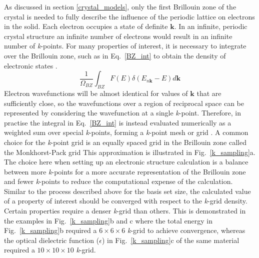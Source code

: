 \documentclass[11pt, twoside]{report}
\begin{document}
As discussed in section \ref{crystal_models}, only the first Brillouin zone of the crystal is needed to fully describe the influence of the periodic lattice on electrons in the solid.
Each electron occupies a state of definite $\mathbf{k}$. In an infinite, periodic crystal structure an infinite number of electrons would result in an infinite number of \textit{k}-points. For many properties of interest, it is necessary to integrate over the Brillouin zone, such as in Eq.~\ref{BZ_int} to obtain the density of electronic states \cite{vasp_k-sampling_slides}.
\begin{equation}\label{BZ_int}
\frac{1}{\Omega_{BZ}} \int_{BZ} F(E)\delta(E_{n\mathbf{k}}-E)d\mathbf{k}    
\end{equation}
Electron wavefunctions will be almost identical for values of $\mathbf{k}$ that are sufficiently close, so the wavefunctions over a region of reciprocal space can be represented by considering the wavefunction at a single \textit{k}-point. Therefore, in practise the integral in Eq.~\ref{BZ_int} is instead evaluated numerically as a weighted sum over special \textit{k}-points, forming a \textit{k}-point mesh or grid \cite{vasp_k-sampling_slides}. A common choice for the \textit{k}-point grid is an equally spaced grid in the Brillouin zone called the Monkhorst-Pack grid \cite{MonkhorstPack}
This approximation is illustrated in Fig.~\ref{k_sampling}a. The choice here when setting up an electronic structure calculation is a balance between more \textit{k}-points for a more accurate representation of the Brillouin zone and fewer \textit{k}-points to reduce the computational expense of the calculation. Similar to the process described above for the basis set size, the calculated value of a property of interest should be converged with respect to the \textit{k}-grid density. Certain properties require a denser \textit{k}-grid than others. This is demonstrated in the examples in Fig.~\ref{k_sampling}b and c where the total energy in Fig.~\ref{k_sampling}b required a $6\times6\times6$ \textit{k}-grid to achieve convergence, whereas the optical dielectric function ($\epsilon$) in Fig.~\ref{k_sampling}c of the same material required a $10\times10\times10$ \textit{k}-grid.
\end{document}
